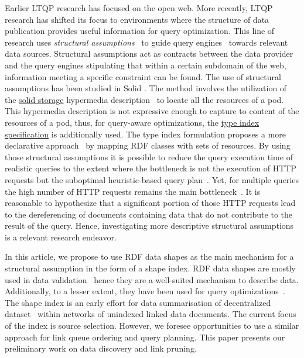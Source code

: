 Earlier LTQP research has focused on the open web.
More recently, LTQP research has shifted its focus to environments where the structure of data publication provides useful information for query optimization.
This line of research uses \emph{structural assumptions}~\cite{Taelman2023} to guide query engines~\cite{verborgh2020guided} towards relevant data sources.
Structural assumptions act as contracts between the data provider and the query engines stipulating that within a certain subdomain of the web, information meeting a specific constraint can be found.
The use of structural assumptions has been studied in Solid \cite{Taelman2023}.
The method involves the utilization of the 
\href{https://solidproject.org/TR/protocol#resources}{solid storage} hypermedia description~\cite{Fielding} to locate all the resources of a pod. 
This hypermedia description is not expressive enough to capture to content of the resources of a pod, thus, for query-aware optimizations, the \href{https://solid.github.io/type-indexes/}{type index specification} is additionally used.
The type index formulation proposes a more declarative approach~\cite{Taelman2017} by mapping RDF classes with sets of resources.
By using those structural assumptions it is possible to reduce the query execution time of realistic queries to the extent where the bottleneck is not the execution of HTTP requests but the suboptimal heuristic-based query plan~\cite{eschauzier_quweda_2023, Taelman2023}.
Yet, for multiple queries the high number of HTTP requests remains the main bottleneck~\cite{eschauzier_quweda_2023}.
It is reasonable to hypothesize that a significant portion of those HTTP requests lead to the dereferencing of documents containing data that do not contribute to the result of the query.
Hence, investigating more descriptive structural assumptions is a relevant research endeavor.

In this article, we propose to use RDF data shapes as the main mechanism for a structural assumption in the form of a shape index.
RDF data shapes are mostly used in data validation~\cite{Gayo2018a} hence they are a well-suited mechanism to describe data.
Additionally, to a lesser extent, they have been used for query optimizations~\cite{kashif2021}.
The shape index is an early effort for data summarisation of decentralized dataset~\cite{Stuckenschmidt2004,Goldman1997, Harth2010} within networks of unindexed linked data documents.
The current focus of the index is source selection.
However, we foresee opportunities to use a similar approach for link queue ordering and query planning.
This paper presents our preliminary work on data discovery and link pruning.
